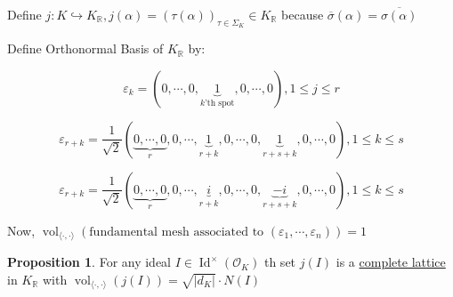 \documentclass[openany]{amsbook}
\numberwithin{section}{chapter}
\theoremstyle{definition}
\newtheorem{proposition}[theorem]{Proposition}
\begin{document}
Define \(j : K \hookrightarrow K_\mathbb{R}, j(\alpha) = (\tau(\alpha))_{\tau \in \Sigma_K}\in K_\mathbb{R}\) because \(\overline{\sigma }(\alpha) = \overline{\sigma(\alpha)} \)

Define Orthonormal Basis of \(K_\mathbb{R}\) by:

\[
    \varepsilon_k = (0, \cdots , 0, \underbrace{1}_{k\text{'th spot}}, 0, \cdots , 0), 1 \leq j \leq r
\]

\[
    \varepsilon_{r+k} = \frac{1}{\sqrt{2}} (\underbrace{0, \cdots , 0}_{r}, 0, \cdots , \underbrace{1}_{r+k}, 0, \cdots , 0, \underbrace{1}_{r+s+k}, 0,\cdots , 0), 1 \leq k \leq s
\]

\[
    \varepsilon_{r+k} = \frac{1}{\sqrt{2}} (\underbrace{0, \cdots , 0}_{r}, 0, \cdots , \underbrace{i}_{r+k}, 0, \cdots , 0, \underbrace{-i}_{r+s+k}, 0,\cdots , 0), 1 \leq k \leq s
\]

Now, \(\operatorname{vol}_{\langle \cdot,\cdot \rangle} (\text{fundamental mesh associated to } (\varepsilon_1, \cdots , \varepsilon_n)) = 1\) 

\begin{proposition}
    For any ideal \(I\in \operatorname{Id}^\times (\mathcal{O}_K)\) th set \(j(I)\) is a \underline{complete lattice} in \(K_\mathbb{R}\) with \(\operatorname{vol}_{\langle \cdot, \cdot \rangle }(j(I)) = \sqrt{\vert d_K \vert} \cdot N(I) \) 
\end{proposition}
\end{document}
